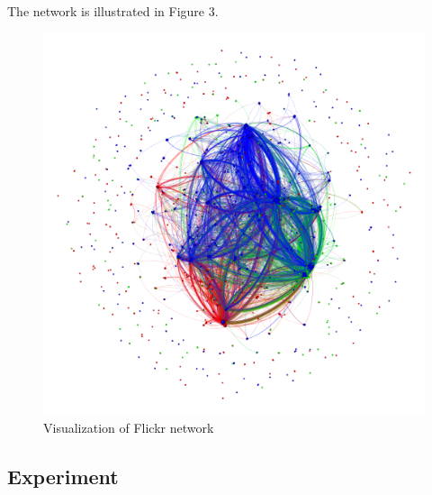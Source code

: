 The network is illustrated in Figure 3.

\begin{figure}[!ht]
	\centering
	\begin{minipage}[b]{0.5\linewidth}
	\centering
	\includegraphics[width=\textwidth]{FIG/flickr.png}
	\caption{Visualization of Flickr network}
	\label{fig:figure1}
	\end{minipage}
\end{figure}	

\subsection{Experiment}
